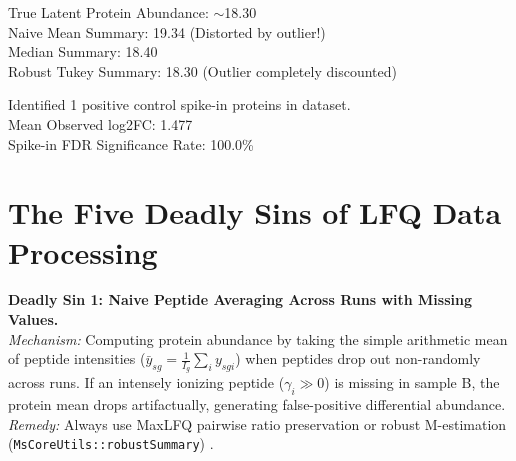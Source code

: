 \documentclass[11pt,oneside]{book}
\begin{document}
\begin{routput}
True Latent Protein Abundance: $\sim$18.30\\
\hspace*{2em}Naive Mean Summary:   19.34 (Distorted by outlier!)\\
\hspace*{2em}Median Summary:       18.40\\
\hspace*{2em}Robust Tukey Summary: 18.30 (Outlier completely discounted)
\end{routput}


\begin{routput}
Identified 1 positive control spike-in proteins in dataset.\\
\hspace*{2em}Mean Observed log2FC: 1.477\\
\hspace*{2em}Spike-in FDR Significance Rate: 100.0\%
\end{routput}

\section{The Five Deadly Sins of LFQ Data Processing}

\begin{pitfallbox}[top=4pt, bottom=4pt, before skip=3pt, after skip=3pt]
\textbf{Deadly Sin 1: Naive Peptide Averaging Across Runs with Missing Values.}\\
\textit{Mechanism:} Computing protein abundance by taking the simple arithmetic mean of peptide intensities ($\bar{y}_{sg} = \frac{1}{I_g} \sum_i y_{sgi}$) when peptides drop out non-randomly across runs. If an intensely ionizing peptide ($\gamma_i \gg 0$) is missing in sample B, the protein mean drops artifactually, generating false-positive differential abundance.\\
\textit{Remedy:} Always use MaxLFQ pairwise ratio preservation or robust M-estimation (\texttt{MsCoreUtils::robustSummary}) \cite{cox2014maxlfq, gatto2023qfeatures}.
\end{pitfallbox}
\end{document}
